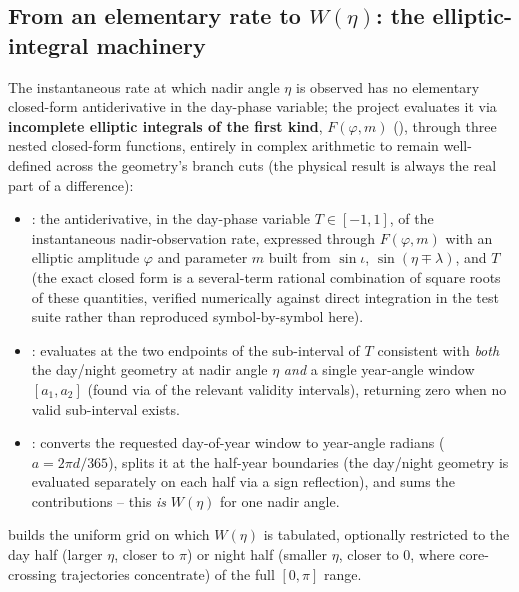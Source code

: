 \begin{theorybox}
\subsection*{From an elementary rate to $W(\eta)$: the elliptic-integral machinery}
The instantaneous rate at which nadir angle $\eta$ is observed has no
elementary closed-form antiderivative in the day-phase variable; the
project evaluates it via \textbf{incomplete elliptic integrals of the
first kind}, $F(\varphi,m)$ (), through
three nested closed-form functions, entirely in complex arithmetic to
remain well-defined across the geometry's branch cuts (the physical result
is always the real part of a difference):
\begin{itemize}
  \item {}: the antiderivative,
    in the day-phase variable $T\in[-1,1]$, of the instantaneous
    nadir-observation rate, expressed through $F(\varphi,m)$ with an
    elliptic amplitude $\varphi$ and parameter $m$ built from
    $\sin\iota$, $\sin(\eta\mp\lambda)$, and $T$ (the exact closed form is
    a several-term rational combination of square roots of these
    quantities, verified numerically against direct integration in the
    test suite rather than reproduced symbol-by-symbol here).
  \item {}: evaluates
     at the two endpoints of the
    sub-interval of $T$ consistent with \emph{both} the day/night geometry
    at nadir angle $\eta$ \emph{and} a single year-angle window
    $[a_1,a_2]$ (found via  of the relevant
    validity intervals), returning zero when no valid sub-interval exists.
  \item {}: converts the requested
    day-of-year window to year-angle radians ($a=2\pi d/365$), splits it at
    the half-year boundaries (the day/night geometry is evaluated
    separately on each half via a sign reflection), and sums the
     contributions -- this \emph{is} $W(\eta)$ for one
    nadir angle.
\end{itemize}
 builds the uniform grid on which
$W(\eta)$ is tabulated, optionally restricted to the day half (larger
$\eta$, closer to $\pi$) or night half (smaller $\eta$, closer to $0$,
where core-crossing trajectories concentrate) of the full $[0,\pi]$ range.
\end{theorybox}

